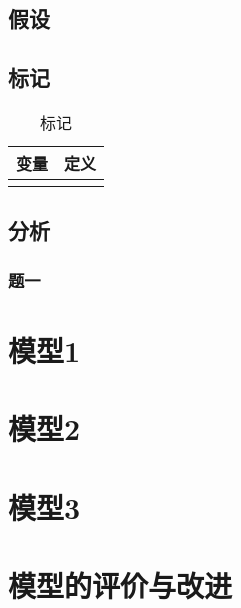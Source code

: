 \documentclass{ctexart}
\newcounter{sub}
\begin{document}
\subsection{假设}%
\label{sub:假设}

\subsection{标记}%
\label{sub:标记}

\begin{table}[htpb]
	\centering
	\caption{标记}
	\label{tab:标记}
	\begin{tabu}to
		\toprule
		变量&定义 \\
		\midrule
			& \\
			\bottomrule
	\end{tabu}

\end{table}

\subsection{分析}%
\label{sub:分析}

\subsubsection{题一}%
\label{ssub:题一}

\newpage

\section{模型1}%
\label{sec:模型1}

\newpage

\section{模型2}%
\label{sec:模型2}

\newpage

\section{模型3}%
\label{sec:模型3}

\newpage

\section{模型的评价与改进}%
\label{sec:模型的评价与改进}
\end{document}

